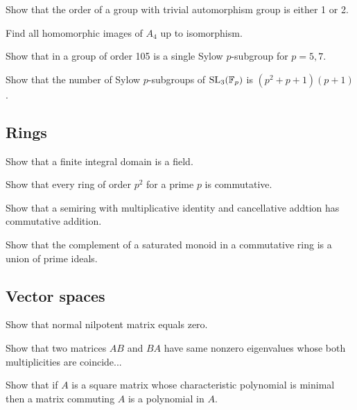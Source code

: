 \documentclass[12pt]{article}
\begin{document}
	\begin{prb}
	Show that the order of a group with trivial automorphism group is either 1 or 2.
	\end{prb}

	\begin{prb}
	Find all homomorphic images of $A_4$ up to isomorphism.
	\end{prb}

	\begin{prb}
	Show that in a group of order 105 is a single Sylow $p$-subgroup for $p=5,7$.
	\end{prb}

	\begin{prb}
	Show that the number of Sylow $p$-subgroups of $\mathrm{SL}_3(\mathbb{F}_p)$ is $(p^2+p+1)(p+1)$.
	\end{prb}

	\subsection{Rings}
	\begin{prb}
	Show that a finite integral domain is a field.
	\end{prb}

	\begin{prb}
	Show that every ring of order $p^2$ for a prime $p$ is commutative.
	\end{prb}

	\begin{prb}
	Show that a semiring with multiplicative identity and cancellative addtion has commutative addition.
	\end{prb}

	\begin{prb}
	Show that the complement of a saturated monoid in a commutative ring is a union of prime ideals.
	\end{prb}

	\subsection{Vector spaces}
	\begin{prb}
	Show that normal nilpotent matrix equals zero.
	\end{prb}

	\begin{prb}
	Show that two matrices $AB$ and $BA$ have same nonzero eigenvalues whose both multiplicities are coincide...
	\end{prb}

	\begin{prb}
	Show that if $A$ is a square matrix whose characteristic polynomial is minimal then a matrix commuting $A$ is a polynomial in $A$.
	\end{prb}
\end{document}
